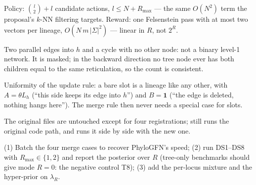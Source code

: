 Policy: $\binom{l}{2}+l$ candidate actions, $l\le N+R_{\max}$ --- the same $O(N^2)$ term the proposal's $k$-NN filtering targets. Reward: one Felsenstein pass with at most two vectors per lineage, $O(N\,m\,|\Sigma|^2)$ --- linear in $R$, not $2^R$.

Two parallel edges into $h$ and a cycle with no other node: not a binary level-1 network. It is masked; in the backward direction no tree node ever has both children equal to the same reticulation, so the count is consistent.

Uniformity of the update rule: a bare slot is a lineage like any other, with $A=\theta L_h$ (``this side keeps its edge into $h$'') and $B=\mathbf 1$ (``the edge is deleted, nothing hangs here''). The merge rule then never needs a special case for slots.

The original files are untouched except for four registrations;  still runs the original code path, and  runs it side by side with the new one.

(1) Batch the four merge cases to recover PhyloGFN's speed; (2) run DS1--DS8 with $R_{\max}\in\{1,2\}$ and report the posterior over $R$ (tree-only benchmarks should give mode $R=0$: the negative control T8); (3) add the per-locus mixture and the hyper-prior on $\lambda_R$.
\clearpage
